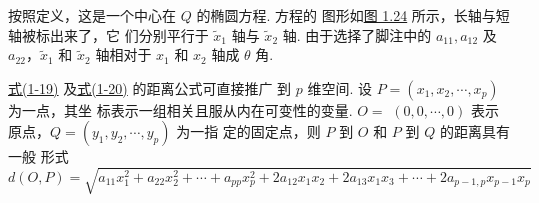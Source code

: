\begin{mvfigure}
\label{fig:1.24}
\end{mvfigure}

按照定义，这是一个中心在 $Q$ 的椭圆方程. 方程的
图形如\hyperref[fig:1.24]{图 1.24} 所示，长轴与短轴被标出来了，它
们分别平行于 $\tilde{x}_1$ 轴与 $\tilde{x}_2$ 轴. 由于选择了脚注中的
$a_{11}, a_{12}$ 及 $a_{22}$，$\tilde{x}_1$ 和 $\tilde{x}_2$ 轴相对于 $x_1$ 和 $x_2$ 轴成 $\theta$ 角.

\hyperref[eq:1-19]{式(1-19)} 及\hyperref[eq:1-20]{式(1-20)} 的距离公式可直接推广
到 $p$ 维空间. 设 $P=(x_1, x_2, \cdots, x_p)$ 为一点，其坐
标表示一组相关且服从内在可变性的变量. $O=$
$(0, 0, \cdots, 0)$ 表示原点，$Q=(y_1, y_2, \cdots, y_p)$ 为一指
定的固定点，则 $P$ 到 $O$ 和 $P$ 到 $Q$ 的距离具有一般
形式
\label{eq:1-22}
\begin{equation}
d(O, P) = \sqrt{a_{11}x_1^2 + a_{22}x_2^2 + \cdots + a_{pp}x_p^2 + 2a_{12}x_1x_2 + 2a_{13}x_1x_3 + \cdots + 2a_{p-1,p}x_{p-1}x_p} \tag{1-22}
\end{equation}
